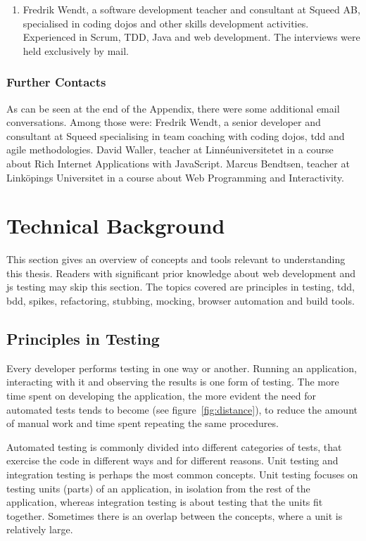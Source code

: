 \documentclass[11pt]{article}
\begin{document}
\begin{enumerate}
\item Fredrik Wendt, a software development teacher and consultant at Squeed AB, specialised in coding dojos and other skills development activities. Experienced in Scrum, TDD, Java and web development. The interviews were held exclusively by mail.
\end{enumerate}

\subsubsection{Further Contacts}

As can be seen at the end of the Appendix, there were some additional email conversations. Among those were: Fredrik Wendt, a senior developer and consultant at Squeed specialising in team coaching with coding dojos, \gls{tdd} and agile methodologies. David Waller, teacher at Linnéuniversitetet in a course about Rich Internet Applications with JavaScript. Marcus Bendtsen, teacher at Linköpings Universitet in a course about Web Programming and Interactivity.


\section{Technical Background}
\label{sec:technicalbackground}

This section gives an overview of concepts and tools relevant to understanding this thesis. Readers with significant prior knowledge about web development and \gls{js} testing may skip this section. The topics covered are principles in testing, \gls{tdd}, \gls{bdd}, spikes, refactoring, stubbing, mocking, browser automation and build tools.

\subsection{Principles in Testing}
\label{subsec:testingbasics}

Every developer performs testing in one way or another. Running an application, interacting with it and observing the results is one form of testing. The more time spent on developing the application, the more evident the need for automated tests tends to become (see figure~\ref{fig:distance}), to reduce the amount of manual work and time spent repeating the same procedures.

Automated testing is commonly divided into different categories of tests, that exercise the code in different ways and for different reasons. Unit testing and integration testing is perhaps the most common concepts. Unit testing focuses on testing units (parts) of an application, in isolation from the rest of the application, whereas integration testing is about testing that the units fit together. Sometimes there is an overlap between the concepts, where a unit is relatively large.
\end{document}

